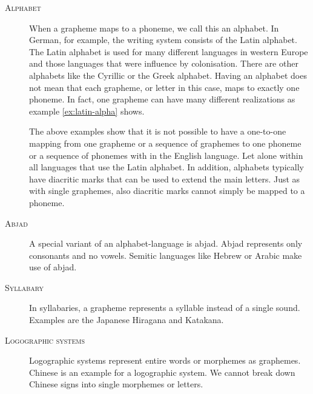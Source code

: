 \begin{description}
\item[\textsc{Alphabet}] When a grapheme maps to a phoneme, we call this an alphabet. In German, for example, the writing system consists of the Latin alphabet. The Latin alphabet is used for many different languages in western Europe and those languages that were influence by colonisation. There are other alphabets like the Cyrillic or the Greek alphabet. Having an alphabet does not mean that each grapheme, or letter in this case, maps to exactly one phoneme. In fact, one grapheme can have many different realizations as example \ref{ex:latin-alpha} shows.

The above examples show that it is not possible to have a one-to-one mapping from one grapheme or a sequence of graphemes to one phoneme or a sequence of phonemes with in the English language. Let alone within all languages that use the Latin alphabet. In addition, alphabets typically have diacritic marks that can be used to extend the main letters. Just as with single graphemes, also diacritic marks cannot simply be mapped to a phoneme.

\item[\textsc{Abjad}] A special variant of an alphabet-language is abjad. Abjad represents only consonants and no vowels. Semitic languages like Hebrew or Arabic make use of abjad.

\begin{covsubexamples}[preamble={Hebrew examples that are first mapped to Latin alphabet then to phonemes.}]
\label{ex:abjad}
\item
\end{covsubexamples}

\item[\textsc{Syllabary}] In syllabaries, a grapheme represents a syllable instead of a single sound. Examples are the Japanese Hiragana and Katakana.

\item[\textsc{Logographic systems}] Logographic systems represent entire words or morphemes as graphemes. Chinese is an example for a logographic system. We cannot break down Chinese signs into single morphemes or letters. 
\end{description}

